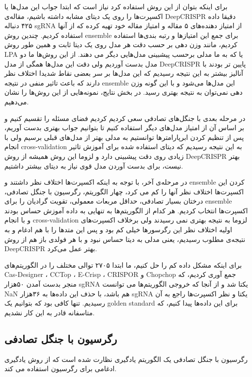 \documentclass[12pt,a4paper,BCOR=.7cm,headsepline,bibliography=totoc]{report}
\begin{document}
برای اینکه بتوان از این روش‌ استفاده کرد نیاز است که ابتدا جواب این مدل‌ها یا اکسپرت‌ها را روی یک دیتای مشابه داشته باشیم، مقاله‌ی DeepCRISPR دقیقا داده ۴۲۵ دنباله sgRNA از امتیاز دهنده‌های ۵ مقاله و امتیاز مقاله خود تهیه کرده که از آنها استفاده کردیم. چندین روش ensemble برای جمع این امتیاز‌ها و رتبه بندی‌ها استفاده کردیم، مانند وزن دهی بر حسب دقت هر مدل روی یک دیتا ثابت و همین طور روش‌ LPA یا  که به ما مدلی برحسب پیشبینی مدل‌هایی دیگر می دهند. از این روش‌ها ما دو مدل بدست آوردیم ولی دقت این مدل‌ها همگی از مدل DeepCRISPR پایین تر بودند با آنالیز بیشتر به این نتیجه رسیدیم که این مدل‌ها بر سر بعضی نقاط شدیدا اختلاف نظر دارند که باعث تاثیر منفی در نتیجه ensemble این مدل‌ها می‌شود و با این گونه وزن دهی نمی‌توان به نتیجه بهتری رسید. در بخش نتایج، نمونه‌هایی از این روش‌ها را نشان می‌دهیم.

در مرحله بعدی با جنگل‌های تصادفی سعی کردیم کردیم فضای مسئله را تقسیم کنیم و بر اساس آن از امتیاز مدل‌های دیگر استفاده کنیم تا بتوانیم جواب بهتری بدست آوریم، پس از تنظیم کردن ابرپارامترها توانستیم به مدلی بهتر از مدل‌های قبلی برسیم ولی با انجام cross-validation به این نتیجه رسیدیم که دیتای استفاده شده برای آموزش تاثیر زیادی روی دقت پیشبینی دارد و لزوما این روش همیشه از روش DeepCRISPR بهتر نیست، برای بدست آوردن مدل قوی نیاز به دیتای بیشتر داشتیم.

در مرحله‌ی آخر، با توجه به اینکه اکسپرت‌ها اختلاف نظر داشتند و ensemble کردن این اکسپرت‌ها اختلاف نظر آنها را کم می کرد،‌ چهار الگوریتم، رگرسیون با جنگل تصادفی، درختان بسیار تصادفی، حداقل مربعات معمولی، تقویت گرادیان را برای ensemble اکسپرت‌ها انتخاب کردیم. هر کدام از الگوریتم‌ها به تنهایی به داده آموزش حساس بودند و با انجام cross-validation لزوما به نتیجه بهتری نمی رسیدند ولی برخلاف اکسپرت‌‌های اولیه اختلاف نظر این رگرسورها خیلی کم بود و پس این متد‌ها را با هم ادغام و به نتیجه‌ی مطلوب رسیدیم، یعنی مدلی به دیتا حساس نبود و با هر فولدی باز‌ هم از روش DeepCRISPR بهتر عمل می‌کرد.

برای اینکه مشکل داده کم را حل کنیم، ما ابتدا ۲۷۰۵ توالی مختلف را در الگوریتم‌های
 Cas-Designer ، CCTop ، E-Crisp ، CRISPOR و Chopchop جمع آوری کردیم، که منجر بدست آمدن ۵۰هزار sgRNA یکتا شد و از آنجا که خروجی الگوریتم‌ها می توانست NaN هم باشد، با حذف این داده‌ها به ۳۶هزار sgRNA یکتا و نظر اکسپرت‌ها راجع به آن رسیدیم. تنها کافی بود که بتوانیم یک golden standard برای این داده‌ها پیدا کنیم، که متاسفانه قادر به این کار نشدیم. 
\subsection{رگرسیون با جنگل تصادفی}
رگرسیون با جنگل تصادفی \cite{Random Forests} یک الگوریتم یادگیری نظارت شده است که از روش یادگیری ادغامی برای رگرسیون استفاده می کند.
\end{document}
